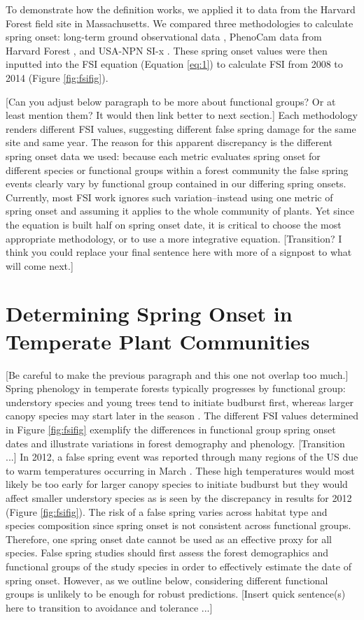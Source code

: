 \documentclass{article}\usepackage[]{graphicx}\usepackage[]{color}
\begin{document}
To demonstrate how the definition works, we applied it to data from the Harvard Forest field site in Massachusetts. We compared three methodologies to calculate spring onset: long-term ground observational data \citep{Okeefe2014}, PhenoCam data from Harvard Forest \citep{Richardson2015}, and USA-NPN SI-x \citep{USA-NPN2016}. These spring onset values were then inputted into the FSI equation (Equation \ref{eq:1}) to calculate FSI from 2008 to 2014 (Figure \ref{fig:fsifig}). 

[Can you adjust below paragraph to be more about functional groups? Or at least mention them? It would then link better to next section.]
Each methodology renders different FSI values, suggesting different false spring damage for the same site and same year. The reason for this apparent discrepancy is the different spring onset data we used: because each metric evaluates spring onset for different species or functional groups within a forest community the false spring events clearly vary by functional group contained in our differing spring onsets. Currently, most FSI work ignores such variation--instead using one metric of spring onset and assuming it applies to the whole community of plants. Yet since the equation is built half on spring onset date, it is critical to choose the most appropriate methodology, or to use a more integrative equation. [Transition? I think you could replace your final sentence here with more of a signpost to what will come next.]

\section{Determining Spring Onset in Temperate Plant Communities}
[Be careful to make the previous paragraph and this one not overlap too much.]
Spring phenology in temperate forests typically progresses by functional group: understory species and young trees tend to initiate budburst first, whereas larger canopy species may start later in the season \citep{Richardson2009, Xin2016}. The different FSI values determined in Figure \ref{fig:fsifig} exemplify the differences in functional group spring onset dates and illustrate variations in forest demography and phenology. [Transition ...] In 2012, a false spring event was reported through many regions of the US due to warm temperatures occurring in March \citep{Ault2015}. These high temperatures would most likely be too early for larger canopy species to initiate budburst but they would affect smaller understory species as is seen by the discrepancy in results for 2012 (Figure \ref{fig:fsifig}). The risk of a false spring varies across habitat type and species composition since spring onset is not consistent across functional groups. Therefore, one spring onset date cannot be used as an effective proxy for all species. False spring studies should first assess the forest demographics and functional groups of the study species in order to effectively estimate the date of spring onset. However, as we outline below, considering different functional groups is unlikely to be enough for robust predictions. [Insert quick sentence(s) here to transition to avoidance and tolerance ...]
\end{document}
